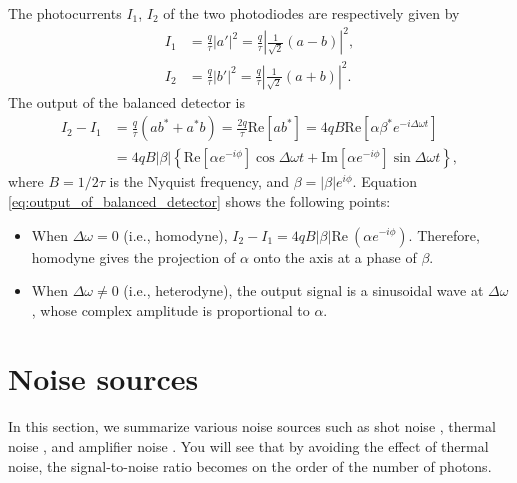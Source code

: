 The photocurrents $I_1$, $I_2$ of the two photodiodes are respectively given by
\begin{equation}
\begin{aligned}
  I_1 &= \frac q \tau |a'|^2 = \frac{q}{\tau}\left|\frac{1}{\sqrt 2} (a - b)\right|^2,\\
  I_2 &= \frac q \tau |b'|^2 = \frac{q}{\tau}\left|\frac{1}{\sqrt 2} (a + b)\right|^2.
\end{aligned}
\end{equation}
The output of the balanced detector is
\begin{equation}
\begin{aligned}
  I_2 - I_1 &= \frac{q}{\tau}(ab^* + a^* b) = \frac{2q}{\tau}\mathrm{Re}[ab^*] 
  = 4qB\mathrm{Re}[\alpha \beta^* e^{-i\Delta\omega t}]\\
  &= 4qB|\beta|\left\{\mathrm{Re} \left[  \alpha e^{-i\phi}\right] \cos \Delta \omega t  + \mathrm{Im} \left[ \alpha e^{-i\phi}\right] \sin \Delta \omega t\right\},
\end{aligned}\label{eq:output_of_balanced_detector}
\end{equation}
where $B = 1/2\tau$ is the Nyquist frequency, and $\beta = |\beta|e^{i\phi}$.
Equation \ref{eq:output_of_balanced_detector} shows the following points: 
\begin{itemize}
	\item When $\Delta \omega = 0$ (i.e., homodyne), $I_2 - I_1 = 4qB|\beta| \mathrm{Re} \ (\alpha e^{-i\phi})$. Therefore, homodyne gives the projection of $\alpha$ onto the axis at a phase of $\beta$. 
	\item When $\Delta \omega \neq 0$ (i.e., heterodyne), the output signal is a sinusoidal wave at $\Delta \omega$, whose complex amplitude is proportional to $\alpha$.
\end{itemize}



\section{Noise sources}
In this section, we summarize various noise sources such as shot noise , thermal noise , and amplifier noise . You will see that by avoiding the effect of thermal noise, the signal-to-noise ratio becomes on the order of the number of photons. 

